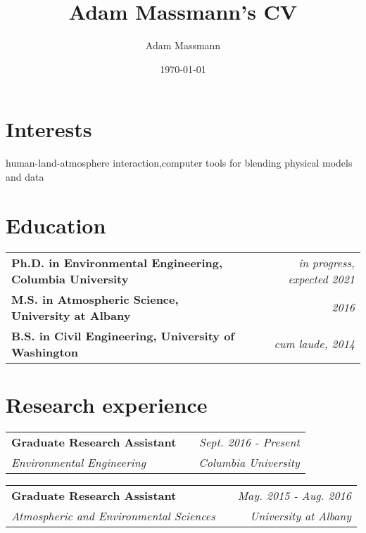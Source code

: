 \documentclass[letterpaper]{article}
\author{Adam Massmann}
\date{\today}
\title{Adam Massmann's CV}
\begin{document}

\section{Interests}
\label{sec:org055839b}

human-land-atmosphere interaction,computer tools for blending physical models and data

\section{Education}
\label{sec:orge43ed1a}

\begin{center}
  \begin{tabularx}{\textwidth}{lXr}
    \textbf{Ph.D. in Environmental Engineering, Columbia University} &  & \emph{in progress, expected 2021}\\
    \textbf{M.S. in Atmospheric Science, University at Albany} &  & \emph{2016}\\
    \textbf{B.S. in Civil Engineering, University of Washington} &  & \emph{cum laude, 2014}\\
  \end{tabularx}
\end{center}

\section{Research experience}
\label{sec:orgda87656}

\begin{center}
  \begin{tabularx}{\textwidth}{lXr}
    \textbf{Graduate Research Assistant} &  & \emph{Sept. 2016 - Present}\\
    \emph{Environmental Engineering} &  & \emph{Columbia University}\\
  \end{tabularx}
\end{center}

\begin{center}
  \begin{tabularx}{\textwidth}{lXr}
    \textbf{Graduate Research Assistant} &  & \emph{May. 2015 - Aug. 2016}\\
    \emph{Atmospheric and Environmental Sciences} &  & \emph{University at Albany}\\
  \end{tabularx}
\end{center}
\end{document}
